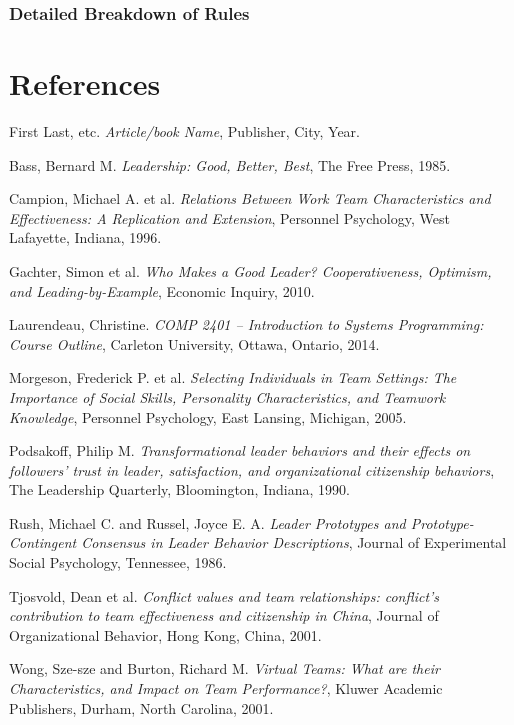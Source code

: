 \documentclass[12pt,letterpaper]{article}
\begin{document}
\subsubsection{Detailed Breakdown of Rules}

\renewcommand\refname{\vskip -1cm}
\section{References}

\begin{thebibliography}{16}

First Last, etc.
{\it Article/book Name},
Publisher, City, Year.

Bass, Bernard M.
{\it Leadership: Good, Better, Best},
The Free Press, 1985.

Campion, Michael A. et al.
{\it Relations Between Work Team Characteristics and Effectiveness: A Replication and Extension},
Personnel Psychology, West Lafayette, Indiana, 1996.

Gachter, Simon et al.
{\it Who Makes a Good Leader? Cooperativeness, Optimism, and Leading-by-Example},
Economic Inquiry, 2010.

Laurendeau, Christine.
{\it COMP 2401 -- Introduction to Systems Programming: Course Outline},
Carleton University, Ottawa, Ontario, 2014.

Morgeson, Frederick P. et al.
{\it Selecting Individuals in Team Settings: The Importance of Social Skills, Personality Characteristics, and Teamwork Knowledge},
Personnel Psychology, East Lansing, Michigan, 2005.

Podsakoff, Philip M.
{\it Transformational leader behaviors and their effects on followers' trust in leader, satisfaction, and organizational citizenship behaviors},
The Leadership Quarterly, Bloomington, Indiana, 1990.

Rush, Michael C. and Russel, Joyce E. A.
{\it Leader Prototypes and Prototype-Contingent Consensus in Leader Behavior Descriptions},
Journal of Experimental Social Psychology, Tennessee, 1986.

Tjosvold, Dean et al.
{\it Conflict values and team relationships: conflict's contribution to team effectiveness and citizenship in China},
Journal of Organizational Behavior, Hong Kong, China, 2001.

Wong, Sze-sze and Burton, Richard M.
{\it Virtual Teams: What are their Characteristics, and Impact on Team Performance?},
Kluwer Academic Publishers, Durham, North Carolina, 2001.

\end{thebibliography}
\end{document}
